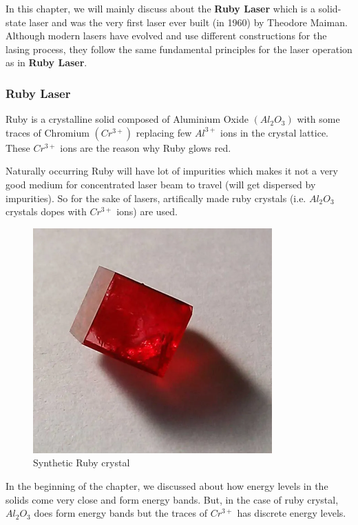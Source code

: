 
In this chapter, we will mainly discuss about the \textbf{Ruby Laser} which is a solid-state laser and was the very first laser ever built (in 1960) by Theodore Maiman. Although modern lasers have evolved and use different constructions for the lasing process, they follow the same fundamental principles for the laser operation as in \textbf{Ruby Laser}.

\subsubsection{Ruby Laser}

Ruby is a crystalline solid composed of Aluminium Oxide $(Al_2O_3)$ with some traces of Chromium $(Cr^{3+})$ replacing few $Al^{3+}$ ions in the crystal lattice. These $Cr^{3+}$ ions are the reason why Ruby glows red. \vspace{.2cm}

Naturally occurring Ruby will have lot of impurities which makes it not a very good medium for concentrated laser beam to travel (will get dispersed by impurities). So for the sake of lasers, artifically made ruby crystals (i.e. $Al_2O_3$ crystals dopes with $Cr^{3+}$ ions) are used. \vspace{.2cm}

\begin{figure}[H]
    \centering
    \includegraphics[scale=.8]{./img/11_ruby_crystal.png}
    \caption{Synthetic Ruby crystal}
\end{figure}

In the beginning of the chapter, we discussed about how energy levels in the solids come very close and form energy bands. But, in the case of ruby crystal, $Al_2O_3$ does form energy bands but the traces of $Cr^{3+}$ has discrete energy levels. \vspace{.2cm}

